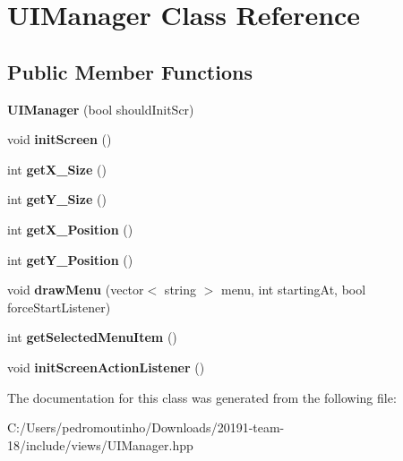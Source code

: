 \hypertarget{class_u_i_manager}{}\section{U\+I\+Manager Class Reference}
\label{class_u_i_manager}
\subsection*{Public Member Functions}
\begin{DoxyCompactItemize}
\item 
\mbox{\label{class_u_i_manager_a90921f00ec8b5b10c571173e8d183fb9}} 
{\bfseries U\+I\+Manager} (bool should\+Init\+Scr)
\item 
\mbox{\label{class_u_i_manager_a263527005952f257540fb88ad90520bd}} 
void {\bfseries init\+Screen} ()
\item 
\mbox{\label{class_u_i_manager_ad28df39a77eecb7a593815b648cffdae}} 
int {\bfseries get\+X\+\_\+\+Size} ()
\item 
\mbox{\label{class_u_i_manager_af82b5651661b605f0b7479e261682df5}} 
int {\bfseries get\+Y\+\_\+\+Size} ()
\item 
\mbox{\label{class_u_i_manager_ab605a6072f156ef96d913050fa1d6949}} 
int {\bfseries get\+X\+\_\+\+Position} ()
\item 
\mbox{\label{class_u_i_manager_a98d63d518a4f9e3b516fd08d780836c7}} 
int {\bfseries get\+Y\+\_\+\+Position} ()
\item 
\mbox{\label{class_u_i_manager_a516d1b113b99156e491018048cb4d247}} 
void {\bfseries draw\+Menu} (vector$<$ string $>$ menu, int starting\+At, bool force\+Start\+Listener)
\item 
\mbox{\label{class_u_i_manager_a8008637d2709dbed41f0cc897f207a6c}} 
int {\bfseries get\+Selected\+Menu\+Item} ()
\item 
\mbox{\label{class_u_i_manager_af299dbeade74ae92b8aaa63cba52860d}} 
void {\bfseries init\+Screen\+Action\+Listener} ()
\end{DoxyCompactItemize}


The documentation for this class was generated from the following file\+:\begin{DoxyCompactItemize}
\item 
C\+:/\+Users/pedromoutinho/\+Downloads/20191-\/team-\/18/include/views/U\+I\+Manager.\+hpp\end{DoxyCompactItemize}

